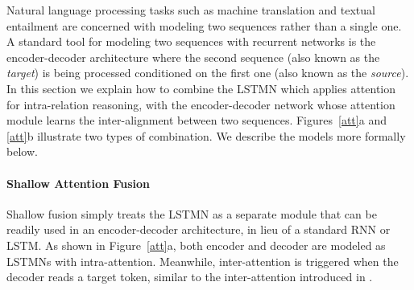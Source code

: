 \documentclass[11pt,letterpaper]{article}
\begin{document}
	Natural language processing tasks such as machine translation
        and textual entailment are concerned with modeling two
        sequences rather than a single one. A standard tool for
        modeling two sequences with recurrent networks is the
        encoder-decoder architecture where the second sequence (also
        known as the \textit{target}) is being processed conditioned
        on the first one (also known as the \textit{source}). In this
        section we explain how to combine the LSTMN which applies
        attention for intra-relation reasoning, with the
        encoder-decoder network whose attention module learns the
        inter-alignment between two sequences. Figures~\ref{att}a and
        \ref{att}b illustrate two types of combination. We describe the
        models more formally below. 
	
	\paragraph{Shallow Attention Fusion}      
        Shallow fusion simply treats the LSTMN as a separate module
        that can be readily used in an encoder-decoder architecture,
        in lieu of a standard RNN or LSTM. As shown in
        Figure~\ref{att}a, both encoder and decoder are modeled as
        LSTMNs with intra-attention. Meanwhile, inter-attention is
        triggered when the decoder reads a target token, similar to
        the inter-attention introduced in
        .
	
\end{document}
